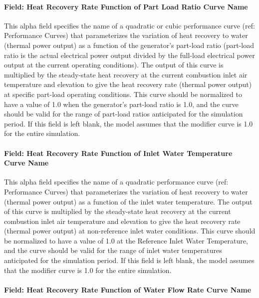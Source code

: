 \paragraph{Field: Heat Recovery Rate Function of Part Load Ratio Curve Name}\label{field-heat-recovery-rate-function-of-part-load-ratio-curve-name}

This alpha field specifies the name of a quadratic or cubic performance curve (ref: Performance Curves) that parameterizes the variation of heat recovery to water (thermal power output) as a function of the generator's part-load ratio (part-load ratio is the actual electrical power output divided by the full-load electrical power output at the current operating conditions). The output of this curve is multiplied by the steady-state heat recovery at the current combustion inlet air temperature and elevation to give the heat recovery rate (thermal power output) at specific part-load operating conditions. This curve should be normalized to have a value of 1.0 when the generator's part-load ratio is 1.0, and the curve should be valid for the range of part-load ratios anticipated for the simulation period. If this field is left blank, the model assumes that the modifier curve is 1.0 for the entire simulation.

\paragraph{Field: Heat Recovery Rate Function of Inlet Water Temperature Curve Name}\label{field-heat-recovery-rate-function-of-inlet-water-temperature-curve-name}

This alpha field specifies the name of a quadratic performance curve (ref: Performance Curves) that parameterizes the variation of heat recovery to water (thermal power output) as a function of the inlet water temperature. The output of this curve is multiplied by the steady-state heat recovery at the current combustion inlet air temperature and elevation to give the heat recovery rate (thermal power output) at non-reference inlet water conditions. This curve should be normalized to have a value of 1.0 at the Reference Inlet Water Temperature, and the curve should be valid for the range of inlet water temperatures anticipated for the simulation period. If this field is left blank, the model assumes that the modifier curve is 1.0 for the entire simulation.

\paragraph{Field: Heat Recovery Rate Function of Water Flow Rate Curve Name}\label{field-heat-recovery-rate-function-of-water-flow-rate-curve-name}

